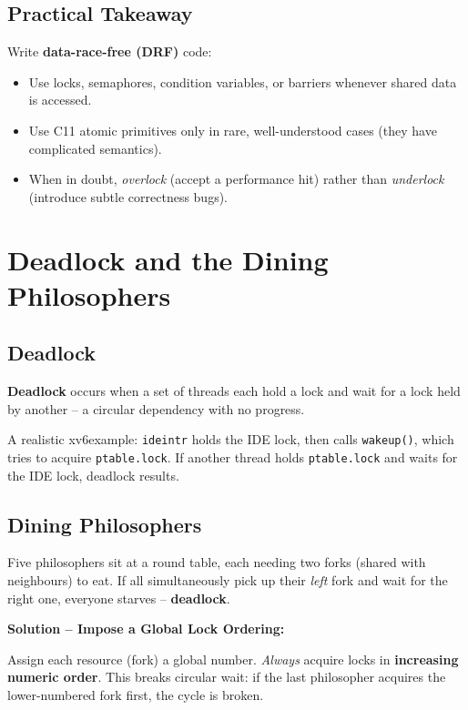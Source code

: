 \documentclass[11pt,a4paper]{article}
\newcommand{\term}[1]{\textbf{#1}}
\newcommand{\code}[1]{\texttt{#1}}
\newcommand{\xv}{xv6}
\begin{document}
\subsection{Practical Takeaway}

Write \term{data-race-free (DRF)} code:
\begin{itemize}
  \item Use locks, semaphores, condition variables, or barriers whenever
    shared data is accessed.
  \item Use C11 atomic primitives only in rare, well-understood cases
    (they have complicated semantics).
  \item When in doubt, \emph{overlock} (accept a performance hit) rather than
    \emph{underlock} (introduce subtle correctness bugs).
\end{itemize}

\section{Deadlock and the Dining Philosophers}

\subsection{Deadlock}

\term{Deadlock} occurs when a set of threads each hold a lock and wait for a
lock held by another -- a circular dependency with no progress.

A realistic \xv example: \code{ideintr} holds the IDE lock, then calls
\code{wakeup()}, which tries to acquire \code{ptable.lock}.  If another thread
holds \code{ptable.lock} and waits for the IDE lock, deadlock results.

\subsection{Dining Philosophers}

Five philosophers sit at a round table, each needing two forks (shared with
neighbours) to eat.  If all simultaneously pick up their \emph{left} fork and
wait for the right one, everyone starves -- \textbf{deadlock}.

\textbf{Solution -- Impose a Global Lock Ordering:}

\begin{keybox}
Assign each resource (fork) a global number.  \emph{Always} acquire locks in
\textbf{increasing numeric order}.  This breaks circular wait: if the last
philosopher acquires the lower-numbered fork first, the cycle is broken.
\end{keybox}
\end{document}
